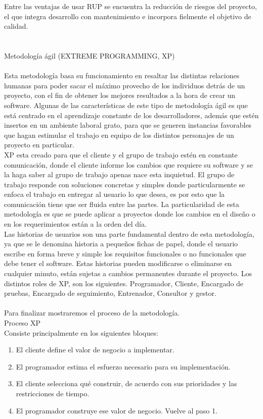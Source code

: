 \documentclass[10pt,a4paper]{article}
\begin{document}
Entre las ventajas de usar RUP se encuentra la reducci\' on 
de riesgos del proyecto, el que integra desarrollo con
 mantenimiento e incorpora fielmente el objetivo de calidad.\\\\\\
Metodolog\' ia \' agil  (EXTREME PROGRAMMING, XP)\\\\
Esta metodolog\' ia basa su funcionamiento en resaltar 
las distintas relaciones humanas para poder sacar el m\' aximo
provecho de los individuos detr\' as
 de un proyecto, con el fin de obtener los mejores resultados a la hora de crear
un software.  Algunas de las
 caracter\' isticas de este tipo de metodolog\' ia \' agil es que est\' a
  centrado en el aprendizaje
constante de los desarrolladores,
 adem\' as que est\' en insertos en un ambiente laboral grato, para que se generen 
instancias favorables que hagan 
estimular el trabajo en equipo de los distintos personajes de un proyecto en 
particular. \\
XP esta creado para que el cliente y 
el grupo de trabajo est\' en en constante comunicaci\' on, donde el cliente informe
 los cambios que requiere su software 
 y  se la haga saber al grupo de trabajo apenas nace esta inquietud. El grupo
de trabajo responde con soluciones
 concretas y simples donde particularmente se enfoca el trabajo en entregar al 
usuario lo que desea, es por esto 
que la comunicaci\' on tiene que ser fluida entre las partes. La particularidad de
esta metodolog\' ia es que se puede 
aplicar a proyectos donde los cambios en el dise\~ no o en los requerimientos est\' an
a la orden del d\' ia. \\
Las historias de usuarios son
 una parte fundamental dentro de esta metodolog\'ia, ya que se le denomina historia a
peque\~ nos fichas de papel,
 donde el usuario escribe en forma breve y simple los requisitos funcionales o no 
funcionales que debe tener el
 software. Estas historias
  pueden modificarse o eliminarse en cualquier minuto, est\' an
sujetas a cambios permanentes durante el proyecto. 
Los distintos roles de XP, son 
los siguientes. Programador, Cliente,  Encargado de pruebas, Encargado de seguimiento,
Entrenador, Consultor y gestor.\\
\\
Para finalizar mostraremos el
 proceso de la metodolog\' ia.\\
Proceso XP\\
Consiste principalmente en los siguientes bloques: \\
\begin{enumerate}
\item El cliente define el valor de negocio a implementar.
\item    El programador estima el
 esfuerzo necesario para su implementaci\' on.
\item   El cliente selecciona qu\' e 
construir, de acuerdo con sus prioridades y las restricciones de tiempo.
\item  El programador construye ese valor de negocio.
     Vuelve al paso 1.\\\\
\end{enumerate}
\end{document}
